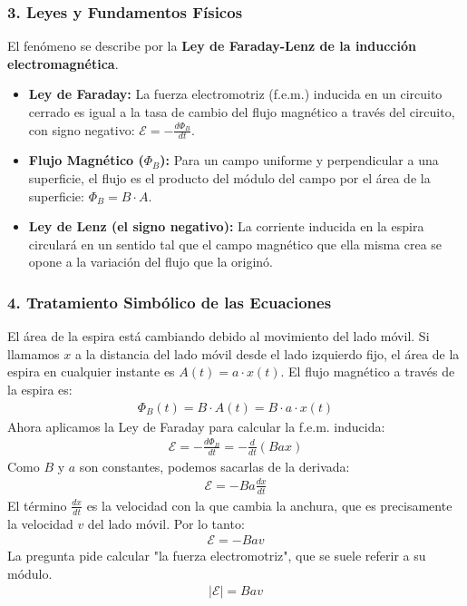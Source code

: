 \subsubsection*{3. Leyes y Fundamentos Físicos}
El fenómeno se describe por la \textbf{Ley de Faraday-Lenz de la inducción electromagnética}.
\begin{itemize}
    \item \textbf{Ley de Faraday:} La fuerza electromotriz (f.e.m.) inducida en un circuito cerrado es igual a la tasa de cambio del flujo magnético a través del circuito, con signo negativo: $\mathcal{E} = - \frac{d\Phi_B}{dt}$.
    \item \textbf{Flujo Magnético ($\Phi_B$):} Para un campo uniforme y perpendicular a una superficie, el flujo es el producto del módulo del campo por el área de la superficie: $\Phi_B = B \cdot A$.
    \item \textbf{Ley de Lenz (el signo negativo):} La corriente inducida en la espira circulará en un sentido tal que el campo magnético que ella misma crea se opone a la variación del flujo que la originó.
\end{itemize}

\subsubsection*{4. Tratamiento Simbólico de las Ecuaciones}
El área de la espira está cambiando debido al movimiento del lado móvil. Si llamamos $x$ a la distancia del lado móvil desde el lado izquierdo fijo, el área de la espira en cualquier instante es $A(t) = a \cdot x(t)$.
El flujo magnético a través de la espira es:
\begin{gather}
    \Phi_B(t) = B \cdot A(t) = B \cdot a \cdot x(t)
\end{gather}
Ahora aplicamos la Ley de Faraday para calcular la f.e.m. inducida:
\begin{gather}
    \mathcal{E} = - \frac{d\Phi_B}{dt} = - \frac{d}{dt}(Bax)
\end{gather}
Como $B$ y $a$ son constantes, podemos sacarlas de la derivada:
\begin{gather}
    \mathcal{E} = -Ba \frac{dx}{dt}
\end{gather}
El término $\frac{dx}{dt}$ es la velocidad con la que cambia la anchura, que es precisamente la velocidad $v$ del lado móvil. Por lo tanto:
\begin{gather}
    \mathcal{E} = -Bav
\end{gather}
La pregunta pide calcular "la fuerza electromotriz", que se suele referir a su módulo.
\begin{gather}
    |\mathcal{E}| = Bav
\end{gather}

